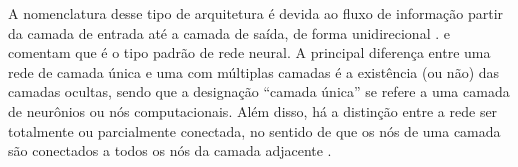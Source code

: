 \documentclass{automatextcc}
\begin{document}





A nomenclatura desse tipo de arquitetura é devida ao fluxo de informação partir da camada de entrada até a camada de saída, de forma unidirecional \citep{goodfellow2016}. \citet{hastie2009} e \citet{fan2021} comentam que é o tipo padrão de rede neural. A principal diferença entre uma rede de camada única e uma com múltiplas camadas é a existência (ou não) das camadas ocultas, sendo que a designação ``camada única'' se refere a uma camada de neurônios ou nós computacionais. Além disso, há a distinção entre a rede ser totalmente ou parcialmente conectada, no sentido de que os nós de uma camada são conectados a todos os nós da camada adjacente \citep{haykin2008}. 
\end{document}
